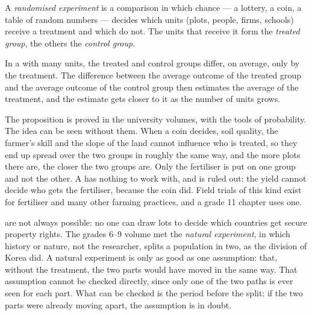 \begin{definition}\label{def:g10:economic-models:randomised-experiment}
A \emph{randomised experiment} is a comparison in which chance --- a
lottery, a coin, a table of random numbers --- decides which units (plots, people, firms, schools)
receive a treatment and which do not. The units that receive it form the \emph{treated group}, the
others the \emph{control group}.
\end{definition}

\begin{proposition}\label{prop:g10:economic-models:lottery}
In a  with many units, the treated and control groups differ, on average, only
by the treatment. The difference between the average outcome of the treated group and the average
outcome of the control group then estimates the average  of the treatment, and the
estimate gets closer to it as the number of units grows.
\end{proposition}
\admitted

The proposition is proved in the university volumes, with the tools of probability. The idea can be
seen without them. When a coin decides, soil quality, the farmer's skill and the slope of the land
cannot influence who is treated, so they end up spread over the two groups in roughly the same way,
and the more plots there are, the closer the two groups are. Only the fertiliser is put on one group
and not the other. A  has nothing to work with, and  is ruled out:
the yield cannot decide who gets the fertiliser, because the coin did. Field trials of this kind
exist for fertiliser and many other farming practices, and a grade 11 chapter uses one.

 are not always possible: no one can draw lots to decide which countries
get secure property rights. The grades 6--9 volume met the \emph{natural experiment}, in which
history or nature, not the researcher, splits a population in two, as the division of Korea did.
A natural experiment is only as good as one assumption: that, without the treatment, the two parts
would have moved in the same way. That assumption cannot be checked directly, since only one of the
two paths is ever seen for each part. What can be checked is the period before the split: if the
two parts were already moving apart, the assumption is in doubt.

